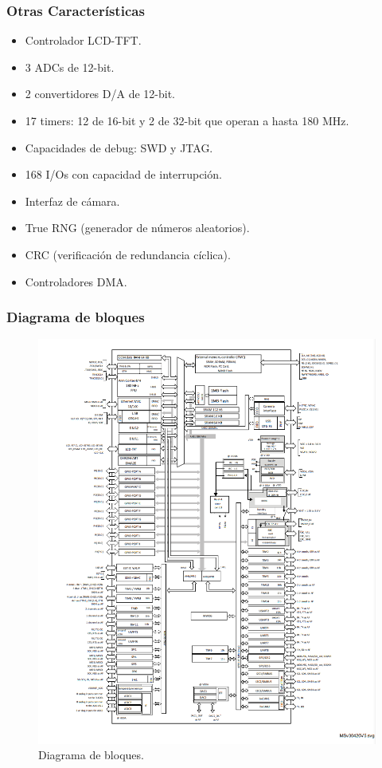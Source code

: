 \subsubsection{Otras Características}
\begin{itemize}
    \item Controlador LCD-TFT.
    \item 3 ADCs de 12-bit.
    \item 2 convertidores D/A de 12-bit.
    \item 17 timers: 12 de 16-bit y 2 de 32-bit que operan a hasta 180 MHz.
    \item Capacidades de debug: SWD y JTAG.
    \item 168 I/Os con capacidad de interrupción.
    \item Interfaz de cámara.
    \item True RNG (generador de números aleatorios).
    \item CRC (verificación de redundancia cíclica).
    \item Controladores DMA.
\end{itemize}
\subsubsection{Diagrama de bloques}
\begin{figure}[H]
    \centering
    \includegraphics[scale=0.8]{images/Diagrama_bloques.png}
    \caption{Diagrama de bloques. \cite{STM32F429xxDatasheet}}
    \label{fig:bloques}
\end{figure}
